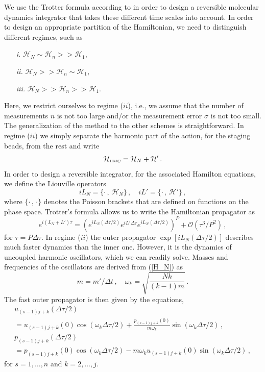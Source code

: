 \documentclass[12pt,a4paper,final]{iopart}
\begin{document}
We use the Trotter formula according to \cite{tuckerman_1992} in order to design a reversible molecular dynamics integrator that takes these different time scales into account.
In order to design an appropriate partition of the Hamiltonian, we need to distinguish different regimes, such as
\begin{enumerate}
  \item[\it i.]
  $\mathcal H_N \sim \mathcal H_n >> \mathcal H_1$,
  \item[\it ii.]
  $\mathcal H_N >> \mathcal H_n \sim \mathcal H_1$,
  \item[\it iii.]
  $\mathcal H_N >> \mathcal H_n >> \mathcal H_1$.
\end{enumerate}
Here, we restrict ourselves to regime ($ii$), i.e., we assume that the number of measurements $n$ is not too large and/or the measurement error $\sigma$ is not too small.
The generalization of the method to the other schemes is straightforward.
In regime ($ii$) we simply separate the harmonic part of the action, for the staging beads, from the rest and write
\begin{equation}
  \mathcal{H}_{\mbox{\tiny HMC}}=\mathcal H_N + \mathcal H'\,.
\end{equation}
In order to design a reversible integrator, for the associated Hamilton equations, we define the Liouville operators
\begin{equation}
  iL_N=\{\cdot\,,\,\mathcal H_N\}\,,\quad
  iL'=\{\cdot\,,\,\mathcal H'\}\,,
\end{equation}
where $\{\cdot\,,\,\cdot\}$ denotes the Poisson brackets that are defined on functions on the phase space.
Trotter's formula \cite{trotter_1959} allows us to write the Hamiltonian propagator as
\begin{equation}\label{propagator}
  e^{i(L_N+L')\tau}
  =
  (e^{iL_N(\Delta\tau/2)}e^{iL'\Delta\tau}e^{iL_N(\Delta\tau/2)})^P
  +
  \mathcal O(\tau^3/P^{2})\,,
\end{equation}
for $\tau =P\Delta \tau$.
In regime ($ii$) the outer propagator $\exp[iL_N(\Delta \tau/2)]$ describes much faster dynamics than the inner one. However, it is the dynamics of uncoupled harmonic oscillators, which we can readily solve.
Masses and frequencies of the oscillators are derived from (\ref{H_N}) as
\begin{equation}
  m=m'/\Delta t\,,\quad
  \omega_k=\sqrt{\frac{Nk}{(k-1)m}}\,.
\end{equation}
The fast outer propagator is then given by the equations,
\begin{eqnarray}
  u_{(s-1)j+k}(\Delta\tau/2) \nonumber \\
  = u_{(s-1)j+k}(0)\cos(\omega_k\Delta\tau/2)
  +
  \frac{p_{(s-1)j+k}(0)}{m\omega_k}\sin(\omega_k\Delta\tau/2)\,,\\
  p_{(s-1)j+k}(\Delta\tau/2) \nonumber \\
  = p_{(s-1)j+k}(0)\cos(\omega_k\Delta\tau/2)
  -
  m\omega_k u_{(s-1)j+k}(0) \sin(\omega_k\Delta\tau/2)\,,
\end{eqnarray}
for $s=1,\dots,n$ and $k=2,\dots,j$.
\end{document}
